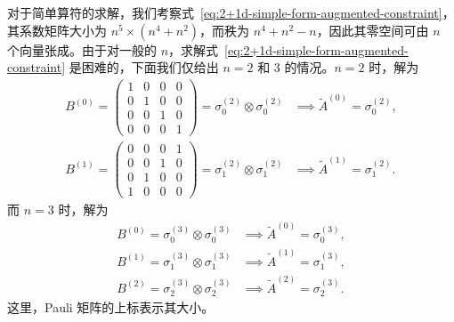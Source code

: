 对于简单算符的求解，我们考察式~\eqref{eq:2+1d-simple-form-augmented-constraint}，其系数矩阵大小为 $n^5\times(n^4+n^2)$，而秩为 $n^4+n^2-n$，因此其零空间可由 $n$ 个向量张成。由于对一般的 $n$，求解式~\eqref{eq:2+1d-simple-form-augmented-constraint} 是困难的，下面我们仅给出 $n=2$ 和 3 的情况。$n=2$ 时，解为
\begin{equation}
  \begin{aligned}
    B^{(0)} = \begin{pmatrix}
      1 & 0 & 0 & 0 \\
      0 & 1 & 0 & 0 \\
      0 & 0 & 1 & 0 \\
      0 & 0 & 0 & 1
    \end{pmatrix}
    = \sigma^{(2)}_0 \otimes \sigma^{(2)}_0
    &\implies \tilde{A}^{(0)} = \sigma^{(2)}_0, \\
    B^{(1)} = \begin{pmatrix}
      0 & 0 & 0 & 1 \\
      0 & 0 & 1 & 0 \\
      0 & 1 & 0 & 0 \\
      1 & 0 & 0 & 0
    \end{pmatrix}
    = \sigma^{(2)}_1 \otimes \sigma^{(2)}_1
    &\implies \tilde{A}^{(1)} = \sigma^{(2)}_1.
  \end{aligned}
  \label{eq:2+1d-z2-solution}
\end{equation}
而 $n=3$ 时，解为
\begin{equation}
  \begin{aligned}
    B^{(0)} = \sigma^{(3)}_0 \otimes \sigma^{(3)}_0 &\implies \tilde{A}^{(0)} = \sigma^{(3)}_0, \\
    B^{(1)} = \sigma^{(3)}_1 \otimes \sigma^{(3)}_1 &\implies \tilde{A}^{(1)} = \sigma^{(3)}_1, \\
    B^{(2)} = \sigma^{(3)}_2 \otimes \sigma^{(3)}_2 &\implies \tilde{A}^{(2)} = \sigma^{(3)}_2.
  \end{aligned}
  \label{eq:2+1d-z3-solution}
\end{equation}
这里，Pauli 矩阵的上标表示其大小。

